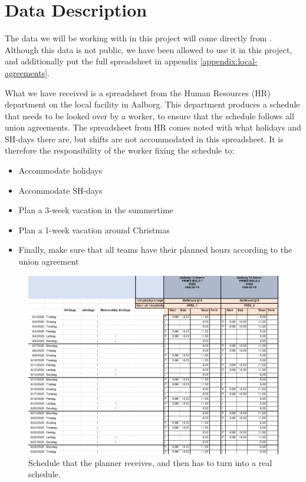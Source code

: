 \section{Data Description} \label{section:datadesc}
The data we will be working with in this project will come directly from \siemens. Although this data is not public, we have been allowed to use it in this project, and additionally put the full spreadsheet in appendix \ref{appendix:local-agreements}.

What we have received is a spreadsheet from the Human Resources (HR) department on the local \siemens facility in Aalborg. This department produces a schedule that needs to be looked over by a worker, to ensure that the schedule follows all union agreements. The spreadsheet from HR comes noted with what holidays and SH-days there are, but shifts are not accommodated in this spreadsheet. It is therefore the responsibility of the worker fixing the schedule to:

\begin{itemize}
    \item Accommodate holidays
    \item Accommodate SH-days
    \item Plan a 3-week vacation in the summertime
    \item Plan a 1-week vacation around Christmas
    \item Finally, make sure that all teams have their planned hours according to the union agreement
\end{itemize}

\begin{figure}[ht!]
    \centering
    \includegraphics[width=\textwidth]{media/Schedule WO fix.png}
    \caption{Schedule that the planner receives, and then has to turn into a real schedule.}
    \label{fig:Schedule no fix}
\end{figure}

